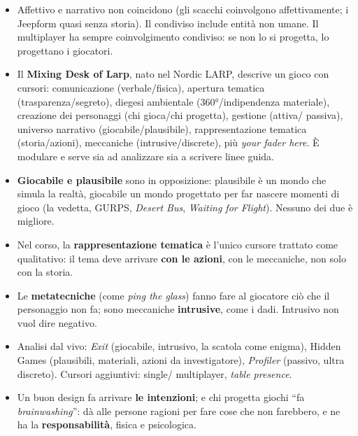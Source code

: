\begin{itemize}
{        ludico}. Non è qualitativo: dice su che cosa il gioco spinge.
  \item Affettivo e narrativo non coincidono (gli scacchi coinvolgono
        affettivamente; i Jeepform quasi senza storia). Il condiviso include
        entità non umane. Il multiplayer ha sempre coinvolgimento condiviso: se
        non lo si progetta, lo progettano i giocatori.
  \item Il \textbf{Mixing Desk of Larp}, nato nel Nordic LARP, descrive un gioco
        con cursori: comunicazione (verbale/fisica), apertura tematica
        (trasparenza/segreto), diegesi ambientale (360°/indipendenza materiale),
        creazione dei personaggi (chi gioca/chi progetta), gestione (attiva/
        passiva), universo narrativo (giocabile/plausibile), rappresentazione
        tematica (storia/azioni), meccaniche (intrusive/discrete), più
        \emph{your fader here}. È modulare e serve sia ad analizzare sia a
        scrivere linee guida.
  \item \textbf{Giocabile e plausibile} sono in opposizione: plausibile è un
        mondo che simula la realtà, giocabile un mondo progettato per far
        nascere momenti di gioco (la vedetta, GURPS, \emph{Desert Bus},
        \emph{Waiting for Flight}). Nessuno dei due è migliore.
  \item Nel corso, la \textbf{rappresentazione tematica} è l'unico cursore
        trattato come qualitativo: il tema deve arrivare \textbf{con le
        azioni}, con le meccaniche, non solo con la storia.
  \item Le \textbf{metatecniche} (come \emph{ping the glass}) fanno fare al
        giocatore ciò che il personaggio non fa; sono meccaniche
        \textbf{intrusive}, come i dadi. Intrusivo non vuol dire negativo.
  \item Analisi dal vivo: \emph{Exit} (giocabile, intrusivo, la scatola come
        enigma), Hidden Games (plausibili, materiali, azioni da investigatore),
        \emph{Profiler} (passivo, ultra discreto). Cursori aggiuntivi: single/
        multiplayer, \emph{table presence}.
  \item Un buon design fa arrivare \textbf{le intenzioni}; e chi progetta giochi
        ``fa \emph{brainwashing}'': dà alle persone ragioni per fare cose che non
        farebbero, e ne ha la \textbf{responsabilità}, fisica e psicologica.
\end{itemize}
